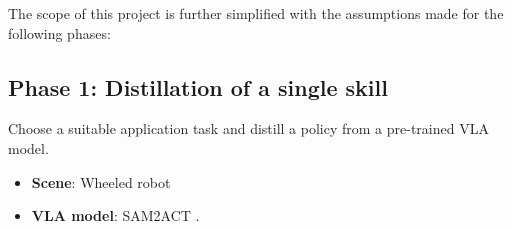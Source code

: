 The scope of this project is further simplified with the assumptions made for the following phases:

\subsection{Phase 1: Distillation of a single skill}

Choose a suitable application task and distill a policy from a pre-trained VLA model.

\begin{itemize}
    \item \textbf{Scene}: Wheeled robot 
    \item \textbf{VLA model}: SAM2ACT \cite{fangSAM2ActIntegratingVisual2025}.
\end{itemize}


